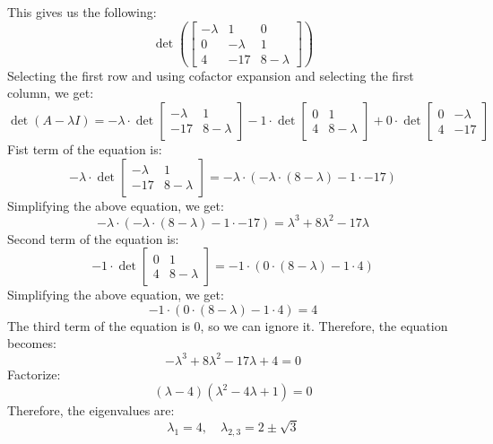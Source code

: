 \documentclass[a4paper,12pt]{article}
\begin{document}
This gives us the following:
\[
\det\left( \begin{bmatrix}
-\lambda & 1 & 0 \\
0 & -\lambda & 1 \\
4 & -17 & 8 - \lambda
\end{bmatrix} \right)
\]
Selecting the first row and using cofactor expansion and selecting the first column, we get:
\begin{equation*}
\det(A - \lambda I) = -\lambda \cdot \det \begin{bmatrix}
    -\lambda & 1 \\
    -17 & 8 - \lambda
    \end{bmatrix}
    - 1 \cdot \det \begin{bmatrix}
    0 & 1 \\
    4 & 8 - \lambda
    \end{bmatrix}
    + 0 \cdot \det \begin{bmatrix}
    0 & -\lambda \\
    4 & -17
    \end{bmatrix}
\end{equation*}
Fist term of the equation is:
\[
-\lambda \cdot \det \begin{bmatrix}
    -\lambda & 1 \\
    -17 & 8 - \lambda
    \end{bmatrix} = -\lambda \cdot (-\lambda \cdot (8 - \lambda) - 1 \cdot -17)
\]
Simplifying the above equation, we get:
\[
-\lambda \cdot (-\lambda \cdot (8 - \lambda) - 1 \cdot -17) = \lambda^3 + 8\lambda^2 - 17\lambda
\]
Second term of the equation is:
\[
- 1 \cdot \det \begin{bmatrix}
    0 & 1 \\
    4 & 8 - \lambda
    \end{bmatrix} = -1 \cdot (0 \cdot (8 - \lambda) - 1 \cdot 4)
\]
Simplifying the above equation, we get:
\[
-1 \cdot (0 \cdot (8 - \lambda) - 1 \cdot 4) = 4
\]
The third term of the equation is 0, so we can ignore it. Therefore, the equation becomes:
\[
-\lambda^3 + 8\lambda^2 - 17\lambda + 4 = 0
\]
Factorize:\[(\lambda - 4)(\lambda^2 - 4\lambda + 1) = 0\]
Therefore, the eigenvalues are:
\[
\lambda_1 = 4, \quad \lambda_{2,3} = 2 \pm \sqrt{3}
\]

\newpage

\end{document}
